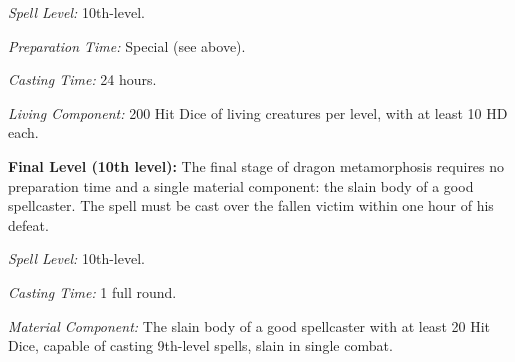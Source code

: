 {\textit{Spell Level:} 10th-level.

\textit{Preparation Time:} Special (see above).

\textit{Casting Time:} 24 hours.

\textit{Living Component:} 200 Hit Dice of living creatures per level, with at least 10 HD each.

\textbf{Final Level (10th level):} The final stage of dragon metamorphosis requires no preparation time and a single material component: the slain body of a good spellcaster. The spell must be cast over the fallen victim within one hour of his defeat.

\textit{Spell Level:} 10th-level.

\textit{Casting Time:} 1 full round.

\textit{Material Component:} The slain body of a good spellcaster with at least 20 Hit Dice, capable of casting 9th-level spells, slain in single combat.

}
